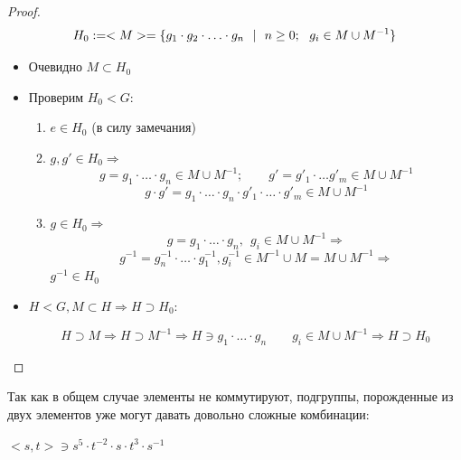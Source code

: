 \begin{proof}
    \[
    H_0 := <M> = \{ g_1\cdot g_2\textsc{} \cdot \ldots \cdot g_n \ \ | \ \ n \ge 0; \ \ g_i \in M \cup M^{-1} \} 
    \]

    \begin{itemize}
        \item Очевидно $M \subset H_0$
        \item Проверим $H_0 < G$:

        \begin{enumerate}
            \item $e \in H_0$ (в силу замечания)
            \item $g, g' \in H_0 \Rightarrow$
            \[ g = g_1\cdot \ldots \cdot g_n \in M \cup M^{-1}; \qquad g' = g'_1\cdot \ldots g'_m \in M \cup M^{-1} \]
            \[ g\cdot g' = g_1\cdot \ldots \cdot g_n \cdot g'_1 \cdot \ldots \cdot g'_m \in M \cup M^{-1} \]
            \item $g \in H_0 \Rightarrow$
            \[ g = g_1 \cdot \ldots \cdot g_n, \ \ g_i \in M \cup M^{-1} \Rightarrow \]
            \[ g^{-1} = g_n^{-1} \cdot \ldots \cdot g^{-1}_1, g^{-1}_i \in M^{-1} \cup M = M \cup M^{-1} \Rightarrow \]
            $g^{-1} \in H_0$
        \end{enumerate}

        \item $H < G, M \subset H \Rightarrow H \supset H_0$:

        \[ H \supset M \Rightarrow H \supset M^{-1} \Rightarrow H \ni g_1\cdot \ldots \cdot g_n \qquad g_i \in M \cup M^{-1} \Rightarrow H \supset H_0 \]
    \end{itemize}
\end{proof}

\begin{remark}

    Так как в общем случае элементы не коммутируют, подгруппы, порожденные из двух элементов уже могут давать довольно сложные комбинации:

    $<s, t> \ni s^5\cdot t^{-2} \cdot s \cdot t^3 \cdot s^{-1}$
\end{remark}

